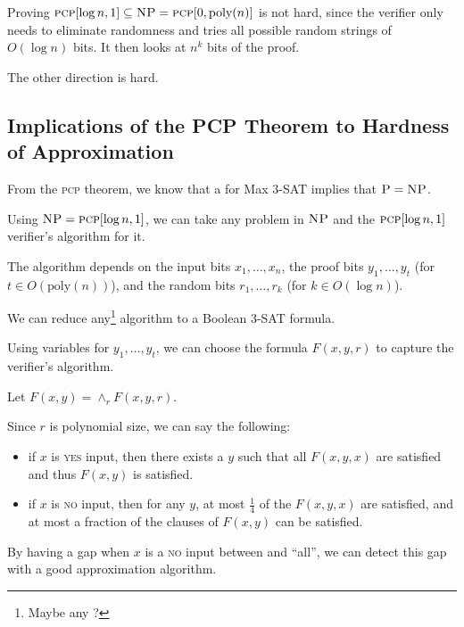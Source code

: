                     Proving $\textsc{pcp}[\log n, 1] \subseteq \textsc{NP} = \textsc{pcp}[0, \text{poly}(n)]$ is not hard, since the verifier only needs to eliminate randomness and tries all possible random strings of $O(\log n)$ bits.
                    It then looks at $n^k$ bits of the proof.

                    The other direction is hard.
                \subsection{Implications of the PCP Theorem to Hardness of Approximation} %
                \label{sub:implications_of_the_pcp_theorem_to_hardness_of_approximation}
                    From the \textsc{pcp} theorem, we know that a \ptas for Max 3-SAT implies that $\textsc{P} = \textsc{NP}$.

                    Using $\textsc{NP} = \textsc{pcp}[\log n, 1]$, we can take any problem in $\textsc{NP}$ and the $\textsc{pcp}[\log n, 1]$ verifier's algorithm for it.

                    The algorithm depends on the input bits $x_1, \ldots, x_n$, the proof bits $y_1, \ldots, y_t$ (for $t \in O(\text{poly}(n))$), and the random bits $r_1, \ldots, r_k$ (for $k \in O(\log n)$).

                    We can reduce any\footnote{Maybe any  \npcomplete?} algorithm to a Boolean 3-SAT formula.

                    Using variables for $y_1, \ldots, y_t$, we can choose the formula $F(x, y, r)$ to capture the verifier's algorithm.

                    Let $F(x, y) = \land_{r} F(x, y, r)$.

                    Since $r$ is polynomial size, we can say the following:
                    \begin{itemize}
                        \item if $x$ is \textsc{yes} input, then there exists a $y$ such that all $F(x, y, x)$ are satisfied and thus $F(x, y)$ is satisfied.
                        \item if $x$ is \textsc{no} input, then for any $y$, at most $\frac{1}{4}$ of the $F(x, y, x)$ are satisfied, and at most a fraction of the clauses of $F(x, y)$ can be satisfied.
                    \end{itemize}
                    By having a gap when $x$ is a \textsc{no} input between \opt and ``all'', we can detect this gap with a good approximation algorithm.
